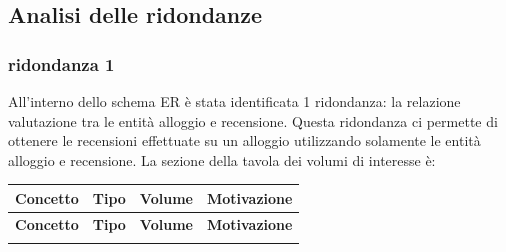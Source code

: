 \subsection{Analisi delle ridondanze}
\subsubsection{ridondanza 1}
All'interno dello schema ER è stata identificata 1 ridondanza: la relazione valutazione tra le entità alloggio e recensione. Questa ridondanza ci permette di ottenere le recensioni effettuate su un alloggio utilizzando solamente le entità alloggio e recensione.
La sezione della tavola dei volumi di interesse è:

\small
\setlength\extrarowheight{2pt}
\begin{longtable}{|l|c|c|p{6.3cm}|}
    \hline \textbf{Concetto} & \textbf{Tipo} & \textbf{Volume} & \textbf{Motivazione}                                                                                                                         \\\hline
    \endfirsthead

    \hline \textbf{Concetto} & \textbf{Tipo} & \textbf{Volume} & \textbf{Motivazione}                                                                                                                         \\\hline
    \endhead

    \endfoot


\end{longtable}
